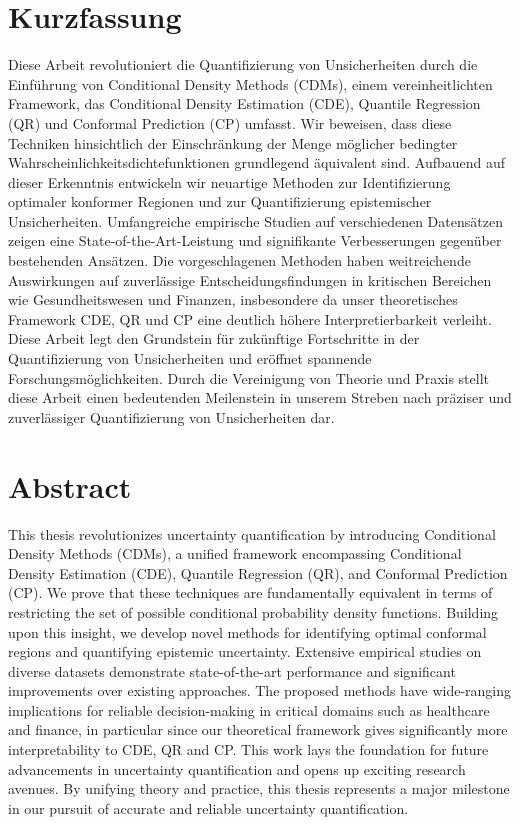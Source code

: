 
{%
	\chapter*{Kurzfassung}
	
	Diese Arbeit revolutioniert die Quantifizierung von Unsicherheiten durch die Einführung von Conditional Density Methods (CDMs), einem vereinheitlichten Framework, das Conditional Density Estimation (CDE), Quantile Regression (QR) und Conformal Prediction (CP) umfasst. Wir beweisen, dass diese Techniken hinsichtlich der Einschränkung der Menge möglicher bedingter Wahrscheinlichkeitsdichtefunktionen grundlegend äquivalent sind. Aufbauend auf dieser Erkenntnis entwickeln wir neuartige Methoden zur Identifizierung optimaler konformer Regionen und zur Quantifizierung epistemischer Unsicherheiten. Umfangreiche empirische Studien auf verschiedenen Datensätzen zeigen eine State-of-the-Art-Leistung und signifikante Verbesserungen gegenüber bestehenden Ansätzen. Die vorgeschlagenen Methoden haben weitreichende Auswirkungen auf zuverlässige Entscheidungsfindungen in kritischen Bereichen wie Gesundheitswesen und Finanzen, insbesondere da unser theoretisches Framework CDE, QR und CP eine deutlich höhere Interpretierbarkeit verleiht. Diese Arbeit legt den Grundstein für zukünftige Fortschritte in der Quantifizierung von Unsicherheiten und eröffnet spannende Forschungsmöglichkeiten. Durch die Vereinigung von Theorie und Praxis stellt diese Arbeit einen bedeutenden Meilenstein in unserem Streben nach präziser und zuverlässiger Quantifizierung von Unsicherheiten dar.
}

{%
	\chapter*{Abstract}
	
	This thesis revolutionizes uncertainty quantification by introducing Conditional Density Methods (CDMs), a unified framework encompassing Conditional Density Estimation (CDE), Quantile Regression (QR), and Conformal Prediction (CP). We prove that these techniques are fundamentally equivalent in terms of restricting the set of possible conditional probability density functions. Building upon this insight, we develop novel methods for identifying optimal conformal regions and quantifying epistemic uncertainty. Extensive empirical studies on diverse datasets demonstrate state-of-the-art performance and significant improvements over existing approaches. The proposed methods have wide-ranging implications for reliable decision-making in critical domains such as healthcare and finance, in particular since our theoretical framework gives significantly more interpretability to CDE, QR and CP. This work lays the foundation for future advancements in uncertainty quantification and opens up exciting research avenues. By unifying theory and practice, this thesis represents a major milestone in our pursuit of accurate and reliable uncertainty quantification.
}